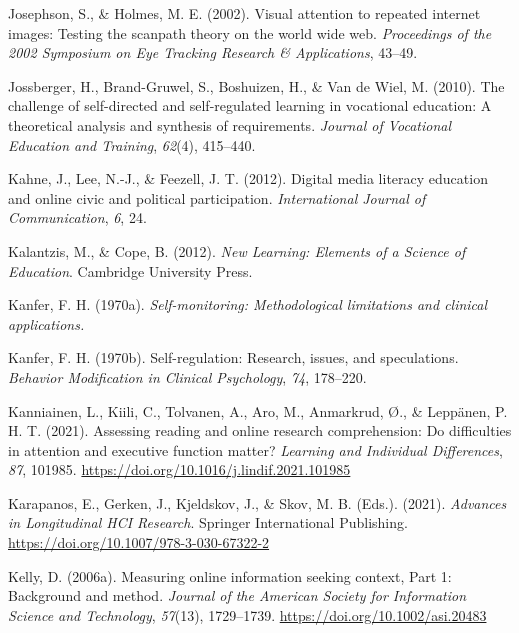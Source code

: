 \documentclass[letterpaper, nobind]{templates/ociamthesis}
\newlength{\cslhangindent}
\newenvironment{CSLReferences}[2] %
 {%
  \setlength{\parindent}{0pt}
  \ifodd #1
  \let\oldpar\par
  \def\par{\hangindent=\cslhangindent\oldpar}
  \fi
  \setlength{\parskip}{1mm}
  \setlength{\baselineskip}{6mm}
 }%
 {}
\begin{document}
\begin{CSLReferences}{1}{0}
\leavevmode{}%
Josephson, S., \& Holmes, M. E. (2002). Visual attention to repeated internet images: Testing the scanpath theory on the world wide web. \emph{Proceedings of the 2002 Symposium on Eye Tracking Research \& Applications}, 43--49.

\leavevmode{}%
Jossberger, H., Brand-Gruwel, S., Boshuizen, H., \& Van de Wiel, M. (2010). The challenge of self-directed and self-regulated learning in vocational education: A theoretical analysis and synthesis of requirements. \emph{Journal of Vocational Education and Training}, \emph{62}(4), 415--440.

\leavevmode{}%
Kahne, J., Lee, N.-J., \& Feezell, J. T. (2012). Digital media literacy education and online civic and political participation. \emph{International Journal of Communication}, \emph{6}, 24.

\leavevmode{}%
Kalantzis, M., \& Cope, B. (2012). \emph{New {Learning}: Elements of a {Science} of {Education}}. {Cambridge University Press}.

\leavevmode{}%
Kanfer, F. H. (1970a). \emph{Self-monitoring: Methodological limitations and clinical applications.}

\leavevmode{}%
Kanfer, F. H. (1970b). Self-regulation: Research, issues, and speculations. \emph{Behavior Modification in Clinical Psychology}, \emph{74}, 178--220.

\leavevmode{}%
Kanniainen, L., Kiili, C., Tolvanen, A., Aro, M., Anmarkrud, Ø., \& Leppänen, P. H. T. (2021). Assessing reading and online research comprehension: Do difficulties in attention and executive function matter? \emph{Learning and Individual Differences}, \emph{87}, 101985. \url{https://doi.org/10.1016/j.lindif.2021.101985}

\leavevmode{}%
Karapanos, E., Gerken, J., Kjeldskov, J., \& Skov, M. B. (Eds.). (2021). \emph{Advances in {Longitudinal HCI Research}}. {Springer International Publishing}. \url{https://doi.org/10.1007/978-3-030-67322-2}

\leavevmode{}%
Kelly, D. (2006a). Measuring online information seeking context, {Part} 1: Background and method. \emph{Journal of the American Society for Information Science and Technology}, \emph{57}(13), 1729--1739. \url{https://doi.org/10.1002/asi.20483}


\end{CSLReferences}
\end{document}
